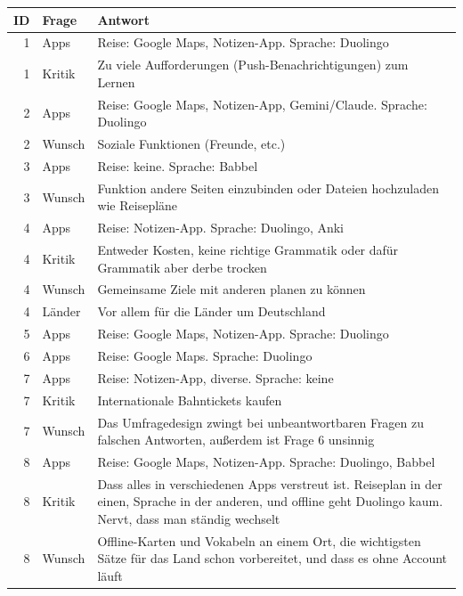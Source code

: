 \documentclass[12pt,a4paper]{scrreprt}
\begin{document}
\begin{table}[!htb]
    \centering
    \footnotesize
    \begin{tabular}{r>{\raggedright\arraybackslash}p{1.6cm}>{\raggedright\arraybackslash}p{11.6cm}}
        \toprule
        ID & Frage & Antwort \\
        \midrule
        1 & Apps & Reise: Google Maps, Notizen-App. Sprache: Duolingo \\
        1 & Kritik & Zu viele Aufforderungen (Push-Benachrichtigungen) zum Lernen \\
        2 & Apps & Reise: Google Maps, Notizen-App, Gemini/Claude. Sprache: Duolingo \\
        2 & Wunsch & Soziale Funktionen (Freunde, etc.) \\
        3 & Apps & Reise: keine. Sprache: Babbel \\
        3 & Wunsch & Funktion andere Seiten einzubinden oder Dateien hochzuladen wie Reisepläne \\
        4 & Apps & Reise: Notizen-App. Sprache: Duolingo, Anki \\
        4 & Kritik & Entweder Kosten, keine richtige Grammatik oder dafür Grammatik aber derbe trocken \\
        4 & Wunsch & Gemeinsame Ziele mit anderen planen zu können \\
        4 & Länder & Vor allem für die Länder um Deutschland \\
        5 & Apps & Reise: Google Maps, Notizen-App. Sprache: Duolingo \\
        6 & Apps & Reise: Google Maps. Sprache: Duolingo \\
        7 & Apps & Reise: Notizen-App, diverse. Sprache: keine \\
        7 & Kritik & Internationale Bahntickets kaufen \\
        7 & Wunsch & Das Umfragedesign zwingt bei unbeantwortbaren Fragen zu falschen Antworten, außerdem ist Frage 6 unsinnig \\
        8 & Apps & Reise: Google Maps, Notizen-App. Sprache: Duolingo, Babbel \\
        8 & Kritik & Dass alles in verschiedenen Apps verstreut ist. Reiseplan in der einen, Sprache in der anderen, und offline geht Duolingo kaum. Nervt, dass man ständig wechselt \\
        8 & Wunsch & Offline-Karten und Vokabeln an einem Ort, die wichtigsten Sätze für das Land schon vorbereitet, und dass es ohne Account läuft \\

\end{tabular}
\end{table}
\end{document}
